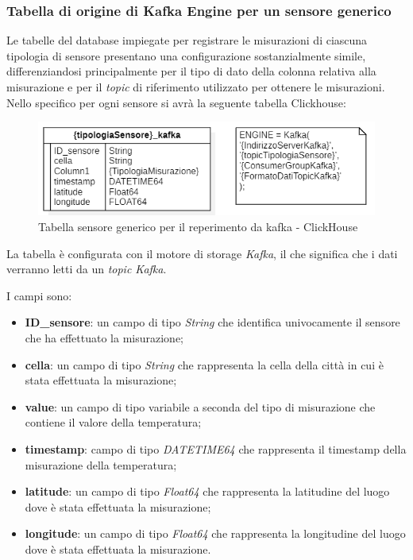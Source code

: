 \subsubsection{Tabella di origine di Kafka Engine per un sensore generico}
Le tabelle del database impiegate per registrare le misurazioni di ciascuna tipologia di sensore presentano una configurazione sostanzialmente simile, differenziandosi principalmente per il tipo di dato della colonna relativa alla misurazione e per il \textit{topic} di riferimento utilizzato per ottenere le misurazioni.
Nello specifico per ogni sensore si avrà la seguente tabella Clickhouse:
\begin{figure}[H]
    \centering
    \includegraphics[width=.6\textwidth]{../Images/SpecificaTecnica/sensorType_kafka.PNG}
    \caption{Tabella sensore generico per il reperimento da kafka - ClickHouse}
    \label{fig:Reperimento_kafka_clickhouse}
  \end{figure}

    La tabella è configurata con il motore di storage \textit{Kafka}, il che significa che i dati verranno letti da un \textit{topic Kafka}. 

    I campi sono:
    \begin{itemize}
        \item \textbf{ID\_sensore}: un campo di tipo \textit{String} che identifica univocamente il sensore che ha effettuato la misurazione;
        \item \textbf{cella}: un campo di tipo \textit{String} che rappresenta la cella della città in cui è stata effettuata la misurazione;
        \item \textbf{value}: un campo di tipo variabile a seconda del tipo di misurazione che contiene il valore della temperatura;
        \item \textbf{timestamp}: campo di tipo \textit{DATETIME64} che rappresenta il timestamp della misurazione della temperatura;
        \item \textbf{latitude}: un campo di tipo \textit{Float64} che rappresenta la latitudine del luogo dove è stata effettuata la misurazione;
        \item \textbf{longitude}: un campo di tipo \textit{Float64} che rappresenta la longitudine del luogo dove è stata effettuata la misurazione.
    \end{itemize}

